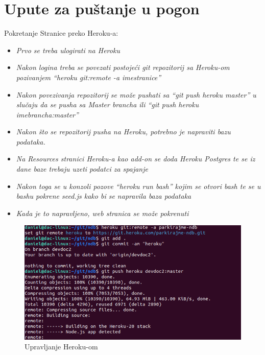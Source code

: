 			\eject 
		
		\section{Upute za puštanje u pogon}
		
		
			Pokretanje Stranice preko Heroku-a:
			\begin{itemize}
				\item 	\textit{Prvo se treba ulogirati na Heroku}
				\item 	\textit{Nakon logina treba se povezati postojeći git repozitorij sa Heroku-om pozivanjem
					“heroku git:remote -a imestranice”}
				\item 	\textit{Nakon povezivanja repozitorij se može pushati sa “git push heroku master” u slučaju da se pusha sa Master brancha ili “git push heroku imebrancha:master”}		
				
				\item 	\textit{Nakon što se repozitorij pusha na Heroku, potrebno je napraviti bazu podataka.}	
				
				\item 	\textit{Na Resources stranici Heroku-a kao add-on se doda Heroku Postgres te se iz dane baze trebaju uzeti podatci za spajanje}
				
				\item 	\textit{Nakon toga se u konzoli pozove “heroku run bash” kojim se otvori bash te se u bashu pokrene seed.js kako bi se napravila baza podataka}
	
				\item 	\textit{Kada je to napravljeno, web stranica se može pokrenuti}
			\end{itemize}
		
		
			

		
		\begin{figure}[H]
			\includegraphics[scale=0.8]{slike/heroku_s1.png} %
			\centering
			\caption{Upravljanje Heroku-om}
			\label{fig:Upravljanje Heroku-om 1}
		\end{figure}
	
